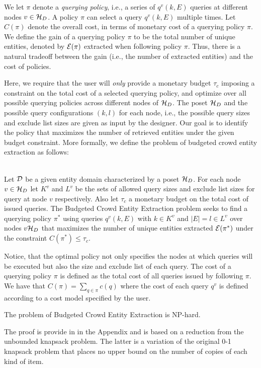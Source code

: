 We let $\pi$ denote a {\em querying policy}, i.e., a series of $q^v(k,E)$ queries at different nodes $v \in \mathcal{H}_D$. A policy $\pi$ can select a query $q^v(k,E)$ multiple times. Let $C(\pi)$ denote the overall cost, in terms of monetary cost of a querying policy $\pi$. We define the gain of a querying policy $\pi$ to be the total number of unique entities, denoted by $\mathcal{E}(\pi)$ extracted when following policy $\pi$. Thus, there is a natural tradeoff between the gain (i.e., the number of extracted entities) and the cost of policies. 

Here, we require that the user will {\em only} provide a monetary budget $\tau_c$ imposing a constraint on the total cost of a selected querying policy, and optimize over all possible querying policies across different nodes of $\mathcal{H}_D$. The poset $\mathcal{H}_D$ and the possible query configurations $(k,l)$ for each node, i.e., the possible query sizes and exclude list sizes are given as input by the designer. Our goal is to identify the policy that maximizes the number of retrieved entities under the given budget constraint. More formally, we define the problem of budgeted crowd entity extraction as follows:

\begin{problem} \ \\
Let $\mathcal{D}$ be a given entity domain characterized by a poset $\mathcal{H}_D$. For each node $v \in \mathcal{H}_D$ let $K^v$ and $L^v$ be the sets of allowed query sizes and exclude list sizes for query at node $v$ respectively. Also let $\tau_c$ a monetary budget on the total cost of issued queries. The Budgeted Crowd Entity Extraction problem seeks to find a querying policy $\pi^*$ using queries $q^v(k,E)$ with $k \in K^v$ and $|E| = l \in L^v$ over nodes $v \mathcal{H}_D$ that maximizes the number of unique entities extracted $\mathcal{E}(\pi^*)$ under the constraint $C(\pi^*) \leq \tau_c$.
\end{problem}
Notice, that the optimal policy not only specifies the nodes at which queries will be executed but also the size and exclude list of each query. The cost of a querying policy $\pi$ is defined as the total cost of all queries issued by following $\pi$. We have that $C(\pi) = \sum_{q \in \pi} c(q)$ where the cost of each query $q^v$ is defined according to a cost model specified by the user. 

\begin{theorem}
The problem of Budgeted Crowd Entity Extraction is NP-hard.
\end{theorem}
The proof is provide in  in the Appendix and is based on a reduction from the unbounded knapsack problem. The latter is a variation of the original 0-1 knapsack problem that places no upper bound on the number of copies of each kind of item.

